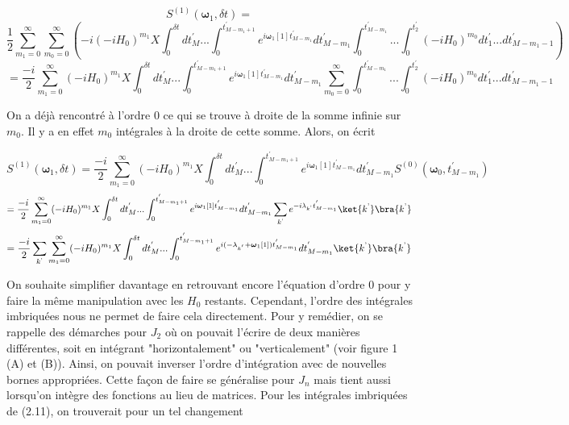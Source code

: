 \begin{equation*}
    S^{(1)}(\boldsymbol{\omega}_1, \delta t) = 
\end{equation*}
\begin{equation*}
    \frac{1}{2} \sum_{m_1 = 0}^{\infty}\sum_{m_0 = 0}^{\infty}\left(-i (-iH_0)^{m_1}X
    \int_{0}^{\delta t}dt_M^{'} ... \int_{0}^{t^{'}_{M-m_1+1}}e^{i\boldsymbol{\omega}_1[1]t^{'}_{M-m_1}} dt_{M-m_1}^{'}\int_{0}^{t^{'}_{M-m_1}}... \int_{0}^{t_2^{'}}(-iH_0)^{m_0} dt_1^{'} ... dt_{M - m_1 - 1}^{'}\right)
\end{equation*}
\begin{equation*}
    = \frac{-i}{2}\sum_{m_1 = 0}^{\infty}(-iH_0)^{m_1}X\int_{0}^{\delta t}dt^{'}_M ... \int_{0}^{t^{'}_{M-m_1+1}}e^{i\boldsymbol{\omega}_1[1]t^{'}_{M-m_1}} dt_{M-m_1}^{'}\sum_{m_0 = 0}^{\infty}\int_{0}^{t^{'}_{M-m_1}}... \int_{0}^{t_2^{'}}(-iH_0)^{m_0} dt_1^{'} ... dt_{M - m_1 - 1}^{'}
\end{equation*}

On a déjà rencontré à l'ordre 0 ce qui se trouve à droite de la somme infinie sur $m_0$. Il y a en effet $m_0$ intégrales à la droite de cette somme. Alors, on écrit

\begin{equation*}
    S^{(1)}(\boldsymbol{\omega}_1, \delta t) = \frac{-i}{2}\sum_{m_1 = 0}^{\infty}(-iH_0)^{m_1}X\int_{0}^{\delta t}dt^{'}_M ... \int_{0}^{t^{'}_{M-m_1+1}}e^{i\boldsymbol{\omega}_1[1]t^{'}_{M-m_1}} dt_{M-m_1}^{'}S^{(0)}(\boldsymbol{\omega}_0, t^{'}_{M-m_1})
\end{equation*}
\begin{equation*}
    = \frac{-i}{2}\sum_{m_1 = 0}^{\infty}(-iH_0)^{m_1}X\int_{0}^{\delta t}dt^{'}_M ... \int_{0}^{t^{'}_{M-m_1+1}}e^{i\boldsymbol{\omega}_1[1]t^{'}_{M-m_1}} dt_{M-m_1}^{'}\sum_{k^\text{'}}e^{-i\lambda_{k^\text{'}}t^{'}_{M-m_1}}\ket{k^\text{'}}\bra{k^\text{'}}
\end{equation*}
\begin{equation}
    = \frac{-i}{2}\sum_{k^\text{'}}\sum_{m_1 = 0}^{\infty}(-iH_0)^{m_1}X\int_{0}^{\delta t}dt^{'}_M ... \int_{0}^{t^{'}_{M-m_1+1}}e^{i(-\lambda_{k^{'}}+\boldsymbol{\omega}_1[1])t^{'}_{M-m_1}} dt_{M-m_1}^{'}\ket{k^\text{'}}\bra{k^\text{'}}
\end{equation}

On souhaite simplifier davantage en retrouvant encore l'équation d'ordre 0 pour y faire la même manipulation avec les $H_0$ restants. Cependant, l'ordre des intégrales imbriquées nous ne permet de faire cela directement. Pour y remédier, on se rappelle des démarches pour $J_2$ où on pouvait l'écrire de deux manières différentes, soit en intégrant "horizontalement" ou "verticalement" (voir figure 1 (A) et (B)). Ainsi, on pouvait inverser l'ordre d'intégration avec de nouvelles bornes appropriées. Cette façon de faire se généralise pour $J_n$ mais tient aussi lorsqu'on intègre des fonctions au lieu de matrices. Pour les intégrales imbriquées de (2.11), on trouverait pour un tel changement

